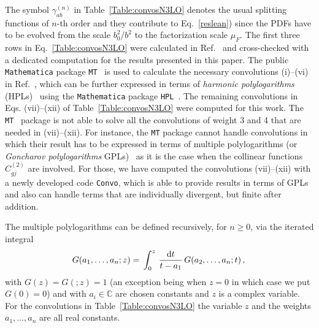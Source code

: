 \documentclass[12pt]{article}
\def\beq{\begin{equation}}
\def\eeq{\end{equation}}
\DeclareRobustCommand{\rd}{\ensuremath{\mathrm{d}}}
\begin{document}
\begin{appendix}
The symbol $\gamma_{ab}^{(n)}$ in Table~\ref{Table:convosN3LO} denotes the usual splitting functions of $n$-th order and they contribute to Eq.~\eqref{reslean}) since the PDFs have to be evolved from the scale $b_0^2/b^2$ to the factorization scale $\mu_{F}$.
The first three rows in Eq.~\eqref{Table:convosN3LO} were calculated in Ref.~\cite{Hoeschele:2012xc} and cross-checked with a dedicated computation for the results presented in this paper. The public \texttt{Mathematica} package \texttt{MT}~\cite{Hoeschele:2013gga} is used to calculate the necessary convolutions (i)--(vi) in Ref.~\cite{Hoeschele:2012xc}, which can be further expressed in terms of \textit{harmonic polylogarithms} (HPLs)~\cite{Remiddi:1999ew} using the \texttt{Mathematica} package \texttt{HPL}~\cite{Maitre:2005uu}. 
The remaining convolutions in Eqs. (vii)--(xii) of Table~\ref{Table:convosN3LO}  were computed  for this work. The \texttt{MT}~\cite{Hoeschele:2013gga} package is not able to solve all the convolutions of weight 3 and 4 that are needed in (vii)--(xii). For instance, the \texttt{MT} package cannot handle convolutions in which their result has to be expressed in terms of multiple polylogarithms (or {\em Goncharov polylogarithms} GPLs)~\cite{Goncharov:1998kja,Gehrmann:2000zt,Goncharov:2001iea} as it is the case when the collinear functions $C^{(2)}_{gj}$ are involved. For those, we have computed the convolutions (vii)--(xii) with a newly developed code \texttt{Convo}, which is able to provide results in terms of GPLs and also can handle terms that are individually divergent, but finite after addition.

The multiple polylogarithms can be defined recursively, for $n\geq 0$, via the iterated integral~\cite{Goncharov:1998kja,Gehrmann:2000zt,Goncharov:2001iea}
 \beq\label{MultPolyLogdef}
 G(a_1,\ldots,a_n;z)=\,\int_0^z\,\frac{\rd t}{t-a_1}\,G(a_2,\ldots,a_n;t)\,,\\
\eeq
with $G(z) = G(;z)=1$ (an exception being when $z=0$ in which case we put $G(0)=0$) and with $a_i\in \mathbb{C}$ are chosen constants and $z$ is a complex variable. For the convolutions in Table~\ref{Table:convosN3LO} the variable $z$ and the weights $a_1,\ldots,a_n$ are all real constants.


\end{appendix}
\end{document}
